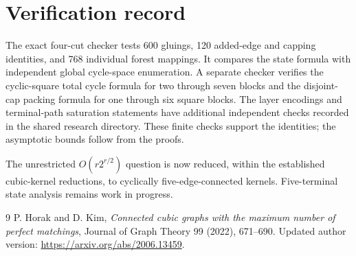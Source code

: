 \documentclass[11pt]{article}
\begin{document}
\section{Verification record}
The exact four-cut checker tests 600 gluings, 120 added-edge and capping identities, and 768 individual forest mappings.
It compares the state formula with independent global cycle-space enumeration.
A separate checker verifies the cyclic-square total cycle formula for two through seven blocks and the disjoint-cap packing formula for one through six square blocks.
The layer encodings and terminal-path saturation statements have additional independent checks recorded in the shared research directory.
These finite checks support the identities; the asymptotic bounds follow from the proofs.

The unrestricted $O(r2^{r/2})$ question is now reduced, within the established cubic-kernel reductions, to cyclically five-edge-connected kernels.
Five-terminal state analysis remains work in progress.
\begin{thebibliography}{9}
 P. Horak and D. Kim, \emph{Connected cubic graphs with the maximum number of perfect matchings}, Journal of Graph Theory 99 (2022), 671--690. Updated author version: \url{https://arxiv.org/abs/2006.13459}.
\end{thebibliography}
\end{document}
